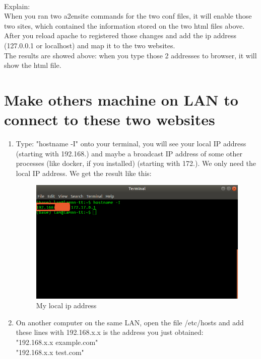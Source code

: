 \documentclass[11pt,a4paper]{report}
\begin{document}
	\\Explain:\\
	When you ran two a2ensite commands for the two conf files, it will enable those two sites, which contained the information stored on the two html files above. After you reload apache to registered those changes and add the ip address (127.0.0.1 or localhost) and map it to the two websites.
	\\The results are showed above: when you type those 2 addresses to browser, it will show the html file.
	\section{Make others machine on LAN to connect to these two websites}
	\newpage
	\begin{enumerate}
		\item Type: "hostname -I" onto your terminal, you will see your local IP address (starting with 192.168.) and maybe a broadcast IP address of some other processes (like docker, if you installed) (starting with 172.). We only need the local IP address. We get the result like this:
		\begin{figure}[h!]
  			\includegraphics[width=\linewidth]{local-ip.png}
  			\caption{My local ip address}
  			\label{fig:loc-ip}
		\end{figure}
		\item On another computer on the same LAN, open the file /etc/hosts and add these lines with 192.168.x.x is the address you just obtained:\\
		"192.168.x.x example.com"\\
		"192.168.x.x test.com"
	\end{enumerate}
\end{document}
